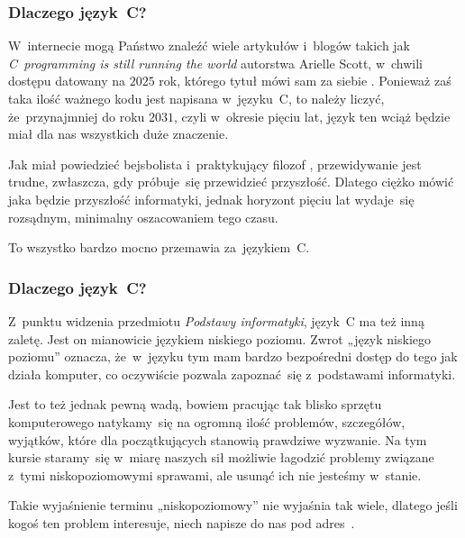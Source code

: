 \documentclass[10pt,t]{beamer}
\begin{document}
\begin{frame}
  \frametitle{Dlaczego język~C?}


  W~internecie mogą Państwo znaleźć wiele artykułów i~blogów takich jak
  {\textit{C~programming is still running the world}} autorstwa Arielle
  Scott, w~chwili dostępu datowany na $2025$ rok, którego tytuł mówi sam za
  siebie \parencite{Scott-C-programming-is-still-ETC-Ver-2025}. Ponieważ
  zaś taka ilość ważnego kodu jest napisana w~języku~C, to należy liczyć,
  że~przynajmniej do roku $2031$, czyli w~okresie pięciu lat, język
  ten wciąż będzie miał dla nas wszystkich duże znaczenie.

  Jak miał powiedzieć bejsbolista i~praktykujący filozof
  , przewidywanie jest trudne, zwłaszcza, gdy próbuje~się
  przewidzieć przyszłość. Dlatego ciężko mówić jaka będzie przyszłość
  informatyki, jednak horyzont pięciu lat wydaje~się rozsądnym, minimalny
  oszacowaniem tego czasu.

  To wszystko bardzo mocno przemawia za~językiem~C.

\end{frame}





\begin{frame}
  \frametitle{Dlaczego język~C?}


  Z~punktu widzenia przedmiotu \textit{Podstawy informatyki}, język~C
  ma też inną zaletę. Jest on mianowicie językiem niskiego poziomu.
  Zwrot „język niskiego poziomu” oznacza, że~w~języku tym mam bardzo
  bezpośredni dostęp do tego jak działa komputer, co oczywiście
  pozwala zapoznać~się z~podstawami informatyki.

  Jest to też jednak pewną wadą, bowiem pracując tak blisko sprzętu
  komputerowego natykamy~się na ogromną ilość problemów, szczegółów,
  wyjątków, które dla początkujących stanowią prawdziwe wyzwanie.
  Na tym kursie staramy~się w~miarę naszych sił możliwie łagodzić problemy
  związane z~tymi niskopoziomowymi sprawami, ale usunąć ich nie jesteśmy
  w~stanie.

  Takie wyjaśnienie terminu „niskopoziomowy” nie wyjaśnia tak wiele,
  dlatego jeśli kogoś ten problem interesuje, niech napisze do nas pod
  adres~\email.

\end{frame}
\end{document}
